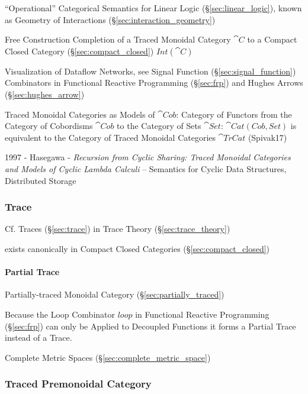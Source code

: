 ``Operational'' Categorical Semantics for Linear Logic
(\S\ref{sec:linear_logic}), known as Geometry of Interactions
(\S\ref{sec:interaction_geometry})

Free Construction Completion of a Traced Monoidal Category $\cat{C}$
to a Compact Closed Category (\S\ref{sec:compact_closed})
$Int(\cat{C})$

Visualization of Dataflow Networks, see Signal Function
(\S\ref{sec:signal_function}) Combinators in Functional Reactive
Programming (\S\ref{sec:frp}) and Hughes Arrows
(\S\ref{sec:hughes_arrow})

Traced Monoidal Categories as Models of $\cat{Cob}$: Category of
Functors from the Category of Cobordisms $\cat{Cob}$ to the Category
of Sets $\cat{Set}$: $\cat{Cat(Cob,Set)}$ is equivalent to the
Category of Traced Monoidal Categories $\cat{TrCat}$ (Spivak17)

1997 - Hasegawa - \emph{Recursion from Cyclic Sharing: Traced Monoidal
  Categories and Models of Cyclic Lambda Calculi} -- Semantics for Cyclic Data
Structures, Distributed Storage



\subsubsection{Trace}\label{sec:category_trace}

\fist Cf. Traces (\S\ref{sec:trace}) in Trace Theory
(\S\ref{sec:trace_theory})

exists canonically in Compact Closed Categories
(\S\ref{sec:compact_closed}) %



\paragraph{Partial Trace}\label{sec:partial_trace}\hfill

Partially-traced Monoidal Category (\S\ref{sec:partially_traced})

Because the Loop Combinator $loop$ in Functional Reactive Programming
(\S\ref{sec:frp}) can only be Applied to Decoupled Functions it forms
a Partial Trace instead of a Trace.

Complete Metric Spaces (\S\ref{sec:complete_metric_space})



\subsubsection{Traced Premonoidal Category}
\label{sec:traced_premonoidal}

